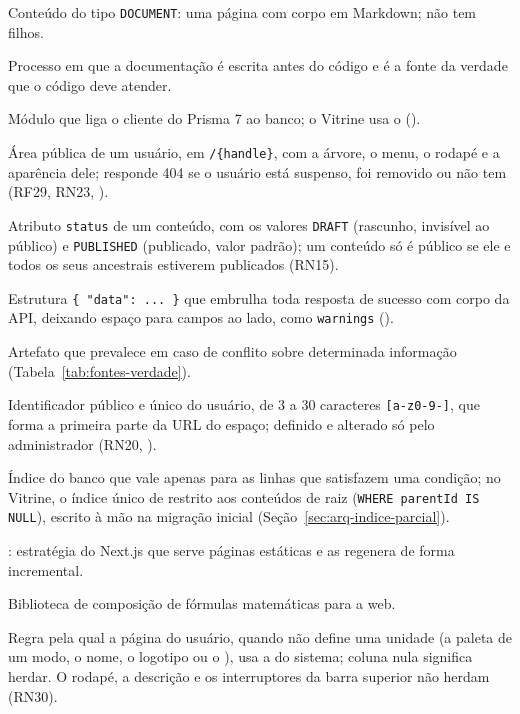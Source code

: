 \begin{description}[style=nextline, leftmargin=0.6cm, itemsep=4pt]
  \item[Documento] Conteúdo do tipo \texttt{DOCUMENT}: uma página com corpo em Markdown; não tem filhos.
  \item[Documentation-Driven Development] Processo em que a documentação é escrita antes do código e é a fonte da verdade que o código deve atender.
  \item[\en{Driver adapter}] Módulo que liga o cliente do Prisma 7 ao banco; o Vitrine usa o  ().
  \item[Espaço] Área pública de um usuário, em \texttt{/\{handle\}}, com a árvore, o menu, o rodapé e a aparência dele; responde 404 se o usuário está suspenso, foi removido ou não tem  (RF29, RN23, ).
  \item[Estado de publicação] Atributo \texttt{status} de um conteúdo, com os valores \texttt{DRAFT} (rascunho, invisível ao público) e \texttt{PUBLISHED} (publicado, valor padrão); um conteúdo só é público se ele e todos os seus ancestrais estiverem publicados (RN15).
  \item[Envelope de resposta] Estrutura \texttt{\{ "data": ... \}} que embrulha toda resposta de sucesso com corpo da API, deixando espaço para campos ao lado, como \texttt{warnings} ().
  \item[Fonte da verdade] Artefato que prevalece em caso de conflito sobre determinada informação (Tabela~\ref{tab:fontes-verdade}).
  \item[\en{Handle}] Identificador público e único do usuário, de 3 a 30 caracteres \texttt{[a-z0-9-]}, que forma a primeira parte da URL do espaço; definido e alterado só pelo administrador (RN20, ).
  \item[Índice parcial] Índice do banco que vale apenas para as linhas que satisfazem uma condição; no Vitrine, o índice único de  restrito aos conteúdos de raiz (\texttt{WHERE parentId IS NULL}), escrito à mão na migração inicial (Seção~\ref{sec:arq-indice-parcial}).
  \item[ISR] : estratégia do Next.js que serve páginas estáticas e as regenera de forma incremental.
  \item[KaTeX] Biblioteca de composição de fórmulas matemáticas para a web.
  \item[Herança] Regra pela qual a página do usuário, quando não define uma unidade (a paleta de um modo, o nome, o logotipo ou o ), usa a do sistema; coluna nula significa herdar. O rodapé, a descrição e os interruptores da barra superior não herdam (RN30).

\end{description}
